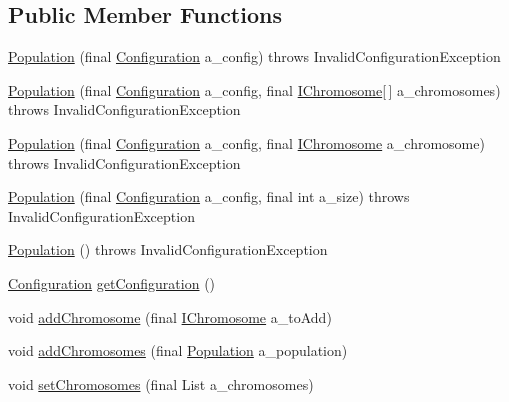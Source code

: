 \subsection*{Public Member Functions}
\begin{DoxyCompactItemize}
\item 
\hyperlink{classorg_1_1jgap_1_1_population_a525a931a8578edb1cda3fda3f34b21a8}{Population} (final \hyperlink{classorg_1_1jgap_1_1_configuration}{Configuration} a\-\_\-config)  throws Invalid\-Configuration\-Exception 
\item 
\hyperlink{classorg_1_1jgap_1_1_population_acfba30f7cc1412d1c7eb57f11b454b4f}{Population} (final \hyperlink{classorg_1_1jgap_1_1_configuration}{Configuration} a\-\_\-config, final \hyperlink{interfaceorg_1_1jgap_1_1_i_chromosome}{I\-Chromosome}\mbox{[}$\,$\mbox{]} a\-\_\-chromosomes)  throws Invalid\-Configuration\-Exception 
\item 
\hyperlink{classorg_1_1jgap_1_1_population_afafcae85feefb2cf3f0e1bb04ee98af6}{Population} (final \hyperlink{classorg_1_1jgap_1_1_configuration}{Configuration} a\-\_\-config, final \hyperlink{interfaceorg_1_1jgap_1_1_i_chromosome}{I\-Chromosome} a\-\_\-chromosome)  throws Invalid\-Configuration\-Exception 
\item 
\hyperlink{classorg_1_1jgap_1_1_population_a8a9a1e7790506e3e3ce43c55246c0331}{Population} (final \hyperlink{classorg_1_1jgap_1_1_configuration}{Configuration} a\-\_\-config, final int a\-\_\-size)  throws Invalid\-Configuration\-Exception 
\item 
\hyperlink{classorg_1_1jgap_1_1_population_a85b83c32f89f499a8ecd15b3293202ed}{Population} ()  throws Invalid\-Configuration\-Exception 
\item 
\hyperlink{classorg_1_1jgap_1_1_configuration}{Configuration} \hyperlink{classorg_1_1jgap_1_1_population_a43613c7bc90d413e2a31bd459f49dfed}{get\-Configuration} ()
\item 
void \hyperlink{classorg_1_1jgap_1_1_population_aab7e3575e2a5979ed22b081f2a7400d4}{add\-Chromosome} (final \hyperlink{interfaceorg_1_1jgap_1_1_i_chromosome}{I\-Chromosome} a\-\_\-to\-Add)
\item 
void \hyperlink{classorg_1_1jgap_1_1_population_a893fbff437dde3d07a4f38f889f5a32d}{add\-Chromosomes} (final \hyperlink{classorg_1_1jgap_1_1_population}{Population} a\-\_\-population)
\item 
void \hyperlink{classorg_1_1jgap_1_1_population_a86b38d39f48f6db65148cdbbd2b5d866}{set\-Chromosomes} (final List a\-\_\-chromosomes)
\item 

\end{DoxyCompactItemize}
